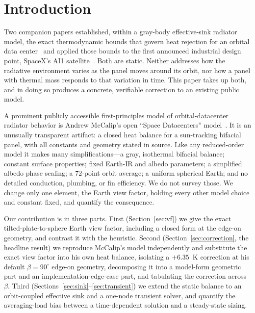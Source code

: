 \documentclass[11pt]{article}
\theoremstyle{remark}
\begin{document}
\section{Introduction}\label{sec:intro}

Two companion papers established, within a gray-body effective-sink radiator
model, the exact thermodynamic bounds that govern heat rejection for an orbital
data center~\cite{paper1} and applied those bounds to the first announced
industrial design point, SpaceX's AI1 satellite~\cite{paper2,dcd2026,toms2026}. Both are
static. Neither addresses how the radiative environment varies as the panel moves
around its orbit, nor how a panel with thermal mass responds to that variation in
time. This paper takes up both, and in doing so produces a concrete, verifiable
correction to an existing public model.

A prominent publicly accessible first-principles model of orbital-datacenter
radiator behavior is Andrew McCalip's open ``Space Datacenters'' model~\cite{mccalip}.
It is an unusually transparent artifact: a closed heat balance for a sun-tracking
bifacial panel, with all constants and geometry stated in source. Like any
reduced-order model it makes many simplifications---a gray, isothermal bifacial
balance; constant surface properties; fixed Earth-IR and albedo parameters; a
simplified albedo phase scaling; a $72$-point orbit average; a uniform spherical
Earth; and no detailed conduction, plumbing, or fin efficiency. We do not survey
those. We change only one element, the Earth view factor, holding every other
model choice and constant fixed, and quantify the consequence.

Our contribution is in three parts. First (Section~\ref{sec:vf}) we give the exact
tilted-plate-to-sphere Earth view factor, including a closed form at the edge-on
geometry, and contrast it with the heuristic. Second
(Section~\ref{sec:correction}, the headline result) we reproduce McCalip's model
independently and substitute the exact view factor into his own heat balance,
isolating a $+6.35$~K correction at his default $\beta=90^{\circ}$ edge-on
geometry, decomposing it into a model-form geometric part and an
implementation-edge-case part, and tabulating the correction across $\beta$. Third
(Sections~\ref{sec:sink}--\ref{sec:transient}) we extend the static balance to an
orbit-coupled effective sink and a one-node transient solver, and quantify the
averaging-load bias between a time-dependent solution and a steady-state sizing.
\end{document}
